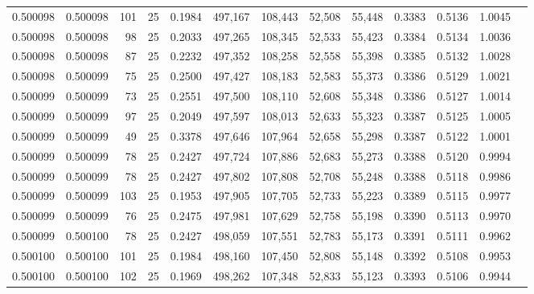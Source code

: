 \begin{tabular}{rrrrrrrrrrrrr}
0.500098 & 0.500098 &   101 &  25 &                                     0.1984 & 497,167 & 108,443 &  52,508 &  55,448 & 0.3383 & 0.5136 & 1.0045 \\
0.500098 & 0.500098 &    98 &  25 &                                     0.2033 & 497,265 & 108,345 &  52,533 &  55,423 & 0.3384 & 0.5134 & 1.0036 \\
0.500098 & 0.500098 &    87 &  25 &                                     0.2232 & 497,352 & 108,258 &  52,558 &  55,398 & 0.3385 & 0.5132 & 1.0028 \\
0.500098 & 0.500099 &    75 &  25 &                                     0.2500 & 497,427 & 108,183 &  52,583 &  55,373 & 0.3386 & 0.5129 & 1.0021 \\
0.500099 & 0.500099 &    73 &  25 &                                     0.2551 & 497,500 & 108,110 &  52,608 &  55,348 & 0.3386 & 0.5127 & 1.0014 \\
0.500099 & 0.500099 &    97 &  25 &                                     0.2049 & 497,597 & 108,013 &  52,633 &  55,323 & 0.3387 & 0.5125 & 1.0005 \\
0.500099 & 0.500099 &    49 &  25 &                                     0.3378 & 497,646 & 107,964 &  52,658 &  55,298 & 0.3387 & 0.5122 & 1.0001 \\
0.500099 & 0.500099 &    78 &  25 &                                     0.2427 & 497,724 & 107,886 &  52,683 &  55,273 & 0.3388 & 0.5120 & 0.9994 \\
0.500099 & 0.500099 &    78 &  25 &                                     0.2427 & 497,802 & 107,808 &  52,708 &  55,248 & 0.3388 & 0.5118 & 0.9986 \\
0.500099 & 0.500099 &   103 &  25 &                                     0.1953 & 497,905 & 107,705 &  52,733 &  55,223 & 0.3389 & 0.5115 & 0.9977 \\
0.500099 & 0.500099 &    76 &  25 &                                     0.2475 & 497,981 & 107,629 &  52,758 &  55,198 & 0.3390 & 0.5113 & 0.9970 \\
0.500099 & 0.500100 &    78 &  25 &                                     0.2427 & 498,059 & 107,551 &  52,783 &  55,173 & 0.3391 & 0.5111 & 0.9962 \\
0.500100 & 0.500100 &   101 &  25 &                                     0.1984 & 498,160 & 107,450 &  52,808 &  55,148 & 0.3392 & 0.5108 & 0.9953 \\
0.500100 & 0.500100 &   102 &  25 &                                     0.1969 & 498,262 & 107,348 &  52,833 &  55,123 & 0.3393 & 0.5106 & 0.9944 \\

\end{tabular}
